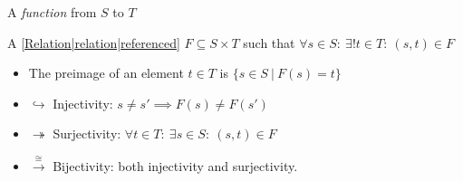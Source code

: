 

A \emph{function} from $S$ to $T$

A \ref{Relation|relation|referenced} $F \subseteq S \times T$ such that $\forall s \in S:\ \exists! t \in T:\ (s,t) \in F$
\begin{itemize}
  \item The preimage of an element $t \in T$ is $\{s \in S\ |\ F(s)=t\}$
  \item $\hookrightarrow$ Injectivity: $s\ne s' \implies F(s)\ne F(s')$
  \item $\twoheadrightarrow$ Surjectivity: $\forall t \in T:\ \exists s \in S:\ (s,t) \in F$
  \item $\xrightarrow \cong$ Bijectivity: both injectivity and surjectivity.
\end{itemize}